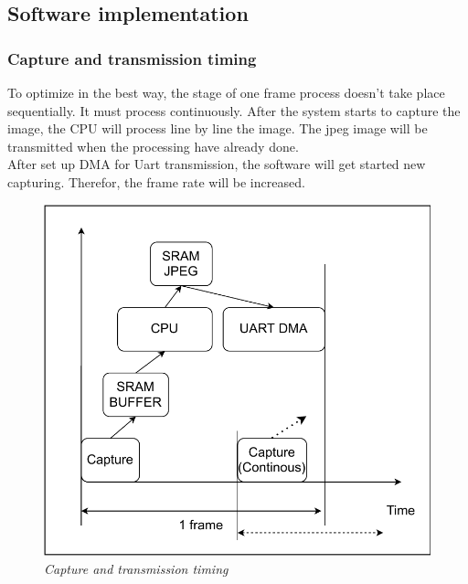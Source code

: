 \documentclass[D:/Latex/Internship/Report/Latex/Report.tex]{subfiles}
\begin{document}
		\subsection{Software implementation}
		\label{subsec:Software implementation}
			\subsubsection{Capture and transmission timing}
				To optimize in the best way, the stage of one frame process doesn't take place sequentially. It must process continuously. After the system starts to capture the image, the CPU will process line by line the image.  The jpeg image will be transmitted when the processing have already done. \\
				After set up DMA for Uart transmission, the software will get started new capturing. Therefor, the frame rate will be increased. \\
				\begin{figure}[ht!]
					\centering
					\includegraphics[scale = 1]{Figure/Software_Implementation.pdf}
					\caption{\it Capture and transmission timing}
					\label{fig:Captutre and transmission timing}
				\end{figure}
\end{document}
